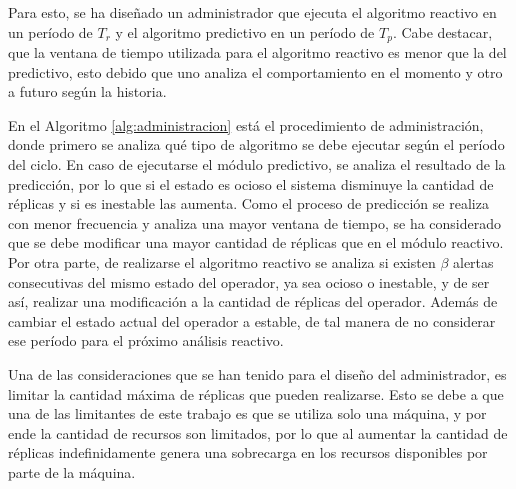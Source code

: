 
\normalsize{Para esto, se ha diseñado un administrador que ejecuta el algoritmo reactivo en un período de $T_r$ y el algoritmo predictivo en un período de $T_p$. Cabe destacar, que la ventana de tiempo utilizada para el algoritmo reactivo es menor que la del predictivo, esto debido que uno analiza el comportamiento en el momento y otro a futuro según la historia.}

En el Algoritmo \ref{alg:administracion} está el procedimiento de administración, donde primero se analiza qué tipo de algoritmo se debe ejecutar según el período del ciclo. En caso de ejecutarse el módulo predictivo, se analiza el resultado de la predicción, por lo que si el estado es ocioso el sistema disminuye la cantidad de réplicas y si es inestable las aumenta. Como el proceso de predicción se realiza con menor frecuencia y analiza una mayor ventana de tiempo, se ha considerado que se debe modificar una mayor cantidad de réplicas que en el módulo reactivo. Por otra parte, de realizarse el algoritmo reactivo se analiza si existen $\beta$ alertas consecutivas del mismo estado del operador, ya sea ocioso o inestable, y de ser así, realizar una modificación a la cantidad de réplicas del operador. Además de cambiar el estado actual del operador a estable, de tal manera de no considerar ese período para el próximo análisis reactivo.

Una de las consideraciones que se han tenido para el diseño del administrador, es limitar la cantidad máxima de réplicas que pueden realizarse. Esto se debe a que una de las limitantes de este trabajo es que se utiliza solo una máquina, y por ende la cantidad de recursos son limitados, por lo que al aumentar la cantidad de réplicas indefinidamente genera una sobrecarga en los recursos disponibles por parte de la máquina.


